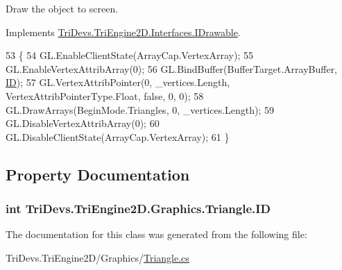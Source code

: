 Draw the object to screen. 



Implements \hyperlink{interface_tri_devs_1_1_tri_engine2_d_1_1_interfaces_1_1_i_drawable_a97752e755d82e7dcd22dc173192790a5}{Tri\-Devs.\-Tri\-Engine2\-D.\-Interfaces.\-I\-Drawable}.


\begin{DoxyCode}
53         \{
54             GL.EnableClientState(ArrayCap.VertexArray);
55             GL.EnableVertexAttribArray(0);
56             GL.BindBuffer(BufferTarget.ArrayBuffer, \hyperlink{class_tri_devs_1_1_tri_engine2_d_1_1_graphics_1_1_triangle_a8e7020e6d54842d8c70e042c935f938d}{ID});
57             GL.VertexAttribPointer(0, \_vertices.Length, VertexAttribPointerType.Float, \textcolor{keyword}{false}, 0, 0);
58             GL.DrawArrays(BeginMode.Triangles, 0, \_vertices.Length);
59             GL.DisableVertexAttribArray(0);
60             GL.DisableClientState(ArrayCap.VertexArray);
61         \}
\end{DoxyCode}


\subsection{Property Documentation}
\hypertarget{class_tri_devs_1_1_tri_engine2_d_1_1_graphics_1_1_triangle_a8e7020e6d54842d8c70e042c935f938d}{
\subsubsection[{I\-D}]{\setlength{\rightskip}{0pt plus 5cm}int Tri\-Devs.\-Tri\-Engine2\-D.\-Graphics.\-Triangle.\-I\-D\hspace{0.3cm}{\ttfamily [get]}}}\label{class_tri_devs_1_1_tri_engine2_d_1_1_graphics_1_1_triangle_a8e7020e6d54842d8c70e042c935f938d}


The documentation for this class was generated from the following file\-:\begin{DoxyCompactItemize}
\item 
Tri\-Devs.\-Tri\-Engine2\-D/\-Graphics/\hyperlink{_triangle_8cs}{Triangle.\-cs}\end{DoxyCompactItemize}
